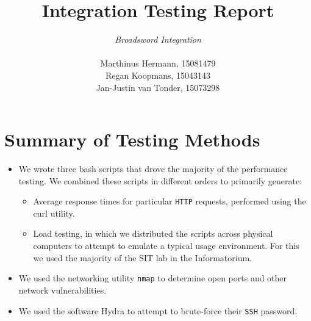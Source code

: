 \documentclass[12pt,a4paper,titlepage]{article}
\author{\textit{Broadsword Integration} \\\\
				Marthinus Hermann, 15081479\\
				Regan Koopmans, 15043143 \\
				Jan-Justin van Tonder, 15073298}
\title{\fontsize{40}{40} Integration Testing Report}
\begin{document}
\maketitle

\section{Summary of Testing Methods}

\begin{itemize}
	\item We wrote three bash scripts that drove the majority of the performance testing. We combined these scripts in different orders to primarily generate:
	   \begin{itemize}
			 \item Average response times for particular \texttt{HTTP} requests, performed using the curl utility.
		   \item Load testing, in which we distributed the scripts across physical computers to attempt to emulate a typical usage environment. For this we used the majority of the SIT lab in the Informatorium.
	   \end{itemize}
	\item We used the networking utility \texttt{nmap} to determine open ports and other network vulnerabilities.
	\item We used the software Hydra to attempt to brute-force their \texttt{SSH} password.
\end{itemize}
\end{document}
